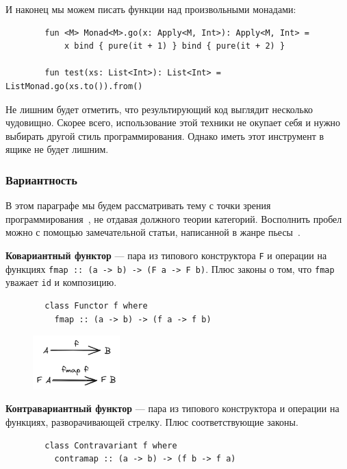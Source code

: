 \documentclass[12pt]{article}
\newcommand{\vocab}[1]{\textbf{#1}} %
\begin{document}
    И наконец мы можем писать функции над произвольными монадами:
    \begin{verbatim}
        fun <M> Monad<M>.go(x: Apply<M, Int>): Apply<M, Int> =
            x bind { pure(it + 1) } bind { pure(it + 2) }

        fun test(xs: List<Int>): List<Int> = ListMonad.go(xs.to()).from()
    \end{verbatim}

    Не лишним будет отметить, что результирующий код выглядит несколько чудовищно.
    Скорее всего, использование этой техники не окупает себя и нужно выбирать другой стиль программирования.
    Однако иметь этот инструмент в ящике не будет лишним.

    \subsubsection{Вариантность}

    В этом параграфе мы будем рассматривать тему с точки зрения программирования~\cite[глава 3]{maguire-types}, не отдавая должного теории категорий.
    Восполнить пробел можно с помощью замечательной статьи, написанной в жанре пьесы~\cite{hinze2012functional}.

    \vocab{Ковариантный функтор} --- пара из типового конструктора \texttt{F} и операции на функциях \texttt{fmap :: (a -> b) -> (F a -> F b)}.
    Плюс законы о том, что \texttt{fmap} уважает \texttt{id} и композицию.

    \begin{verbatim}
        class Functor f where
          fmap :: (a -> b) -> (f a -> f b)
    \end{verbatim}

    \begin{figure}[H]
        \centering
        \includegraphics[width=0.3\textwidth]{figs/functor}
    \end{figure}

    \vocab{Контравариантный функтор} --- пара из типового конструктора и операции на функциях, разворачивающей стрелку.
    Плюс соответствующие законы.

    \begin{verbatim}
        class Contravariant f where
          contramap :: (a -> b) -> (f b -> f a)
    \end{verbatim}
\end{document}
